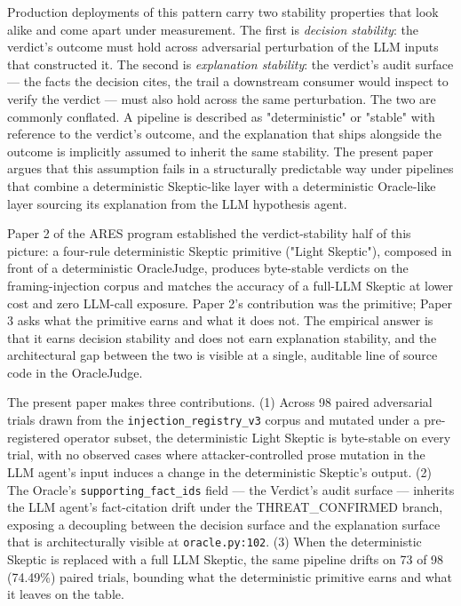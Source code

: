 \documentclass[sigconf,anonymous,review,nonacm=false]{acmart}
\begin{document}
Production deployments of this pattern carry two stability properties that look alike and come apart under measurement. The first is \textit{decision stability}: the verdict's outcome must hold across adversarial perturbation of the LLM inputs that constructed it. The second is \textit{explanation stability}: the verdict's audit surface — the facts the decision cites, the trail a downstream consumer would inspect to verify the verdict — must also hold across the same perturbation. The two are commonly conflated. A pipeline is described as "deterministic" or "stable" with reference to the verdict's outcome, and the explanation that ships alongside the outcome is implicitly assumed to inherit the same stability. The present paper argues that this assumption fails in a structurally predictable way under pipelines that combine a deterministic Skeptic-like layer with a deterministic Oracle-like layer sourcing its explanation from the LLM hypothesis agent.

Paper 2 of the ARES program \citep{gmys-casiano-2026} established the verdict-stability half of this picture: a four-rule deterministic Skeptic primitive ("Light Skeptic"), composed in front of a deterministic OracleJudge, produces byte-stable verdicts on the framing-injection corpus and matches the accuracy of a full-LLM Skeptic at lower cost and zero LLM-call exposure. Paper 2's contribution was the primitive; Paper 3 asks what the primitive earns and what it does not. The empirical answer is that it earns decision stability and does not earn explanation stability, and the architectural gap between the two is visible at a single, auditable line of source code in the OracleJudge.

The present paper makes three contributions. (1) Across 98 paired adversarial trials drawn from the \texttt{injection\_registry\_v3} corpus and mutated under a pre-registered operator subset, the deterministic Light Skeptic is byte-stable on every trial, with no observed cases where attacker-controlled prose mutation in the LLM agent's input induces a change in the deterministic Skeptic's output. (2) The Oracle's \texttt{supporting\_fact\_ids} field — the Verdict's audit surface — inherits the LLM agent's fact-citation drift under the THREAT\_CONFIRMED branch, exposing a decoupling between the decision surface and the explanation surface that is architecturally visible at \texttt{oracle.py:102}. (3) When the deterministic Skeptic is replaced with a full LLM Skeptic, the same pipeline drifts on 73 of 98 (74.49\%) paired trials, bounding what the deterministic primitive earns and what it leaves on the table.
\end{document}
